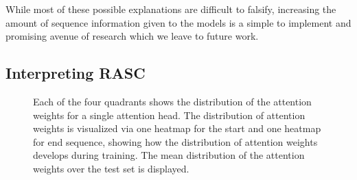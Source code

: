 \begin{itemize}
\end{itemize}

While most of these possible explanations are difficult to falsify, increasing the amount of sequence information given to the models is a simple to implement and promising avenue of research which we leave to future work. 



\subsection{Interpreting RASC} \label{subsubsec:attn_interpretation}


\begin{figure}
	\centering
	
	\caption{Each of the four quadrants shows the distribution of the attention weights for a single attention head. The distribution of attention weights is visualized via one heatmap for the start and one heatmap for end sequence, showing how the distribution of attention weights develops during training. The mean distribution of the attention weights over the test set is displayed.}
	\label{fig:attn_heatmap}
	
	
\end{figure}


